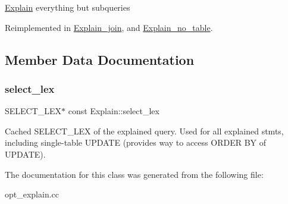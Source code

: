 \mbox{\hyperlink{classExplain}{Explain}} everything but subqueries 

Reimplemented in \mbox{\hyperlink{classExplain__join_aa8ce397a394026c9065ffbfb0d624d75}{Explain\+\_\+join}}, and \mbox{\hyperlink{classExplain__no__table_abb0311250686fc0cb30d9632150312eb}{Explain\+\_\+no\+\_\+table}}.



\subsection{Member Data Documentation}
\mbox{\label{classExplain_ad66987d49df1e5712c2af2f646561503}} 
\subsubsection{\texorpdfstring{select\+\_\+lex}{select\_lex}}
{\footnotesize\ttfamily S\+E\+L\+E\+C\+T\+\_\+\+L\+EX$\ast$ const Explain\+::select\+\_\+lex\hspace{0.3cm}{\ttfamily [protected]}}

Cached S\+E\+L\+E\+C\+T\+\_\+\+L\+EX of the explained query. Used for all explained stmts, including single-\/table U\+P\+D\+A\+TE (provides way to access O\+R\+D\+ER BY of U\+P\+D\+A\+TE). 

The documentation for this class was generated from the following file\+:\begin{DoxyCompactItemize}
\item 
opt\+\_\+explain.\+cc\end{DoxyCompactItemize}
